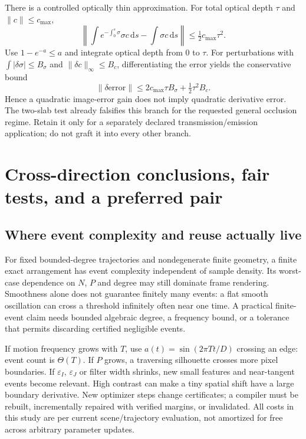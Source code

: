 \documentclass[10pt,letterpaper]{article}
\theoremstyle{remark}\newtheorem{counterexample}[proposition]{Counterexample}
\newcommand{\dd}{\,\mathrm d}
\newcommand{\eps}{\varepsilon}
\begin{document}
There is a controlled optically thin approximation. For total optical depth $\tau$ and $\|c\|\leq c_{\max}$,
\begin{equation}
 \left\|\int e^{-\int_0^s\sigma}\sigma c\dd s-\int\sigma c\dd s\right\|
 \leq\tfrac12c_{\max}\tau^2.
\end{equation}
Use $1-e^{-a}\leq a$ and integrate optical depth from $0$ to $\tau$. For perturbations with $\int|\delta\sigma|\leq B_\sigma$ and $\|\delta c\|_\infty\leq B_c$, differentiating the error yields the conservative bound
\begin{equation}
 \|\delta\mathrm{error}\|\leq2c_{\max}\tau B_\sigma+\tfrac12\tau^2B_c.
\end{equation}
Hence a quadratic image-error gain does not imply quadratic derivative error. The two-slab test already falsifies this branch for the requested general occlusion regime. Retain it only for a separately declared transmission/emission application; do not graft it into every other branch.

\section{Cross-direction conclusions, fair tests, and a preferred pair}

\subsection{Where event complexity and reuse actually live}
For fixed bounded-degree trajectories and nondegenerate finite geometry, a finite exact arrangement has event complexity independent of sample density. Its worst-case dependence on $N$, $P$ and degree may still dominate frame rendering. Smoothness alone does not guarantee finitely many events: a flat smooth oscillation can cross a threshold infinitely often near one time. A practical finite-event claim needs bounded algebraic degree, a frequency bound, or a tolerance that permits discarding certified negligible events.

If motion frequency grows with $T$, use $a(t)=\sin(2\pi Tt/D)$ crossing an edge: event count is $\Theta(T)$. If $P$ grows, a traversing silhouette crosses more pixel boundaries. If $\eps_I$, $\eps_J$ or filter width shrinks, new small features and near-tangent events become relevant. High contrast can make a tiny spatial shift have a large boundary derivative. New optimizer steps change certificates; a compiler must be rebuilt, incrementally repaired with verified margins, or invalidated. All costs in this study are per current scene/trajectory evaluation, not amortized for free across arbitrary parameter updates.
\end{document}
